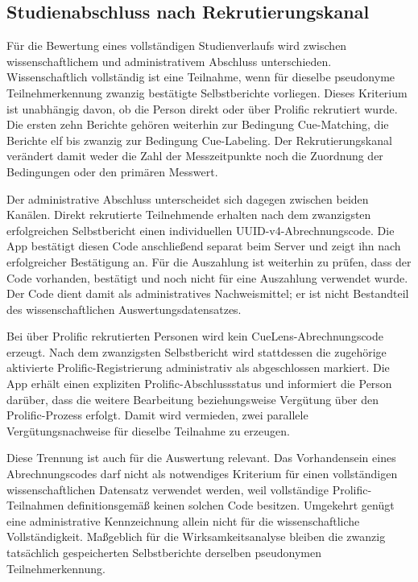 
\begin{neu}
\section{Studienabschluss nach Rekrutierungskanal}

Für die Bewertung eines vollständigen Studienverlaufs wird zwischen wissenschaftlichem und administrativem Abschluss unterschieden. Wissenschaftlich vollständig ist eine Teilnahme, wenn für dieselbe pseudonyme Teilnehmerkennung zwanzig bestätigte Selbstberichte vorliegen. Dieses Kriterium ist unabhängig davon, ob die Person direkt oder über Prolific rekrutiert wurde. Die ersten zehn Berichte gehören weiterhin zur Bedingung Cue-Matching, die Berichte elf bis zwanzig zur Bedingung Cue-Labeling. Der Rekrutierungskanal verändert damit weder die Zahl der Messzeitpunkte noch die Zuordnung der Bedingungen oder den primären Messwert.

Der administrative Abschluss unterscheidet sich dagegen zwischen beiden Kanälen. Direkt rekrutierte Teilnehmende erhalten nach dem zwanzigsten erfolgreichen Selbstbericht einen individuellen UUID-v4-Abrechnungscode. Die App bestätigt diesen Code anschließend separat beim Server und zeigt ihn nach erfolgreicher Bestätigung an. Für die Auszahlung ist weiterhin zu prüfen, dass der Code vorhanden, bestätigt und noch nicht für eine Auszahlung verwendet wurde. Der Code dient damit als administratives Nachweismittel; er ist nicht Bestandteil des wissenschaftlichen Auswertungsdatensatzes.

Bei über Prolific rekrutierten Personen wird kein CueLens-Abrechnungscode erzeugt. Nach dem zwanzigsten Selbstbericht wird stattdessen die zugehörige aktivierte Prolific-Registrierung administrativ als abgeschlossen markiert. Die App erhält einen expliziten Prolific-Abschlussstatus und informiert die Person darüber, dass die weitere Bearbeitung beziehungsweise Vergütung über den Prolific-Prozess erfolgt. Damit wird vermieden, zwei parallele Vergütungsnachweise für dieselbe Teilnahme zu erzeugen.

Diese Trennung ist auch für die Auswertung relevant. Das Vorhandensein eines Abrechnungscodes darf nicht als notwendiges Kriterium für einen vollständigen wissenschaftlichen Datensatz verwendet werden, weil vollständige Prolific-Teilnahmen definitionsgemäß keinen solchen Code besitzen. Umgekehrt genügt eine administrative Kennzeichnung allein nicht für die wissenschaftliche Vollständigkeit. Maßgeblich für die Wirksamkeitsanalyse bleiben die zwanzig tatsächlich gespeicherten Selbstberichte derselben pseudonymen Teilnehmerkennung.


\end{neu}
